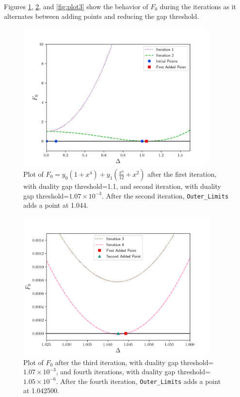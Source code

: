 \documentclass[12pt]{article}
\numberwithin{equation}{section}
\begin{document}
\pagebreak

Figures \ref{fig:plot1}, \ref{fig:plot2}, and
\ref{fig:plot3} show the behavior of $F_0$ during the iterations
as it alternates between adding points and reducing the gap threshold.

\begin{figure}
\begin{center}
\includegraphics[width=0.9\textwidth]{outer_plots_1}
\end{center}
\caption{Plot of $F_{0}=y_{0}\left(1+x^4\right) + y_{1}\left(\frac{x^4}{12} + x^2\right)$
  after the first iteration, with duality gap threshold=1.1, and second
  iteration, with duality gap threshold=$1.07\times10^{-3}$.  After the second
  iteration, \texttt{Outer\_Limits} adds a point at 1.044.}
\label{fig:plot1}
\end{figure}

\begin{figure}
\begin{center}
\includegraphics[width=0.9\textwidth]{outer_plots_2}
\end{center}
\caption{Plot of $F_{0}$
  after the third iteration, with duality gap threshold=$1.07\times10^{-3}$, and fourth iterations, with duality gap threshold=$1.05\times10^{-6}$.  After the fourth
  iteration, \texttt{Outer\_Limits} adds a point at 1.042500.}
\label{fig:plot2}
\end{figure}
\end{document}
